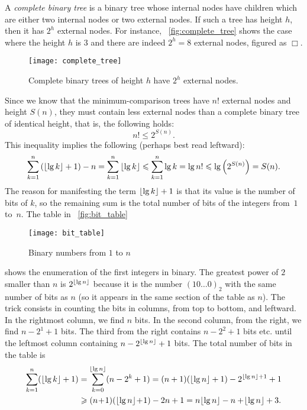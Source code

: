 A \emph{complete binary tree} is a binary tree whose internal nodes
have children which are either two internal nodes or two external
nodes. If such a tree has height \(h\), then it has \(2^h\) external
nodes. For instance, \fig~\vref{fig:complete_tree} shows the case
where the height \(h\) is 3 and there are indeed \(2^h=8\) external
nodes, figured as \(\Box\).
\begin{figure}[b]
\centering
\texttt{[image: complete\_tree]}
\caption{Complete binary trees of height \(h\) have \(2^h\) external
  nodes.\label{fig:complete_tree}}
\end{figure}
Since we know that the minimum\hyp{}comparison trees have \(n!\)
external nodes and height \(S(n)\), they must contain less external
nodes than a complete binary tree of identical height, that is, the
following holds:
\begin{equation*}
n! \leqslant 2^{S(n)}.
\end{equation*}
This inequality implies the following (perhaps best read leftward):
\begin{equation*}
\sum_{k=1}^{n}{(\lfloor{\lg k}\rfloor + 1)} - n
= \sum_{k=1}^{n}{\lfloor{\lg k}\rfloor}
\leqslant \sum_{k=1}^{n}{\lg k}
= \lg n! \leqslant \lg\left(2^{S(n)}\right) = S(n).
\end{equation*}
The reason for manifesting the term \(\lfloor{\lg k}\rfloor + 1\) is that its
value is the number of bits of \(k\), so the remaining sum is the
total number of bits of the integers from~\(1\) to~\(n\). The table in
\fig~\vref{fig:bit_table} 
\begin{figure}[t]
\centering
\texttt{[image: bit\_table]}
\caption{Binary numbers from \(1\) to \(n\)\label{fig:bit_table}}
\end{figure}
shows the enumeration of the first integers in binary. The greatest
power of \(2\) smaller than \(n\) is \(2^{\lfloor{\lg n}\rfloor}\) because it
is the number \((10\dots0)_2\) with the same number of bits as \(n\)
(so it appears in the same section of the table as \(n\)). The trick
consists in counting the bits in columns, from top to bottom, and
leftward. In the rightmost column, we find \(n\) bits. In the second
column, from the right, we find \(n-2^1+1\) bits. The third from the
right contains \(n-2^2+1\) bits etc. until the leftmost column
containing \(n-2^{\lfloor{\lg n}\rfloor}+1\) bits. The total number of bits in
the table is
\begin{align*}
\sum_{k=1}^{n}{\!(\lfloor{\lg k}\rfloor+1)}
  &= \sum_{k=0}^{\lfloor{\lg n}\rfloor}{\!(n-2^k+1)}
   = (n+ 1)(\lfloor{\lg n}\rfloor + 1) - 2^{\lfloor{\lg n}\rfloor+1} + 1\\
  &\geqslant (n\!+\!1)(\lfloor{\lg n}\rfloor\! +\! 1) - 2n + 1
  = n\lfloor{\lg n}\rfloor - n + \!\lfloor{\lg n}\rfloor + 3.
\end{align*}
